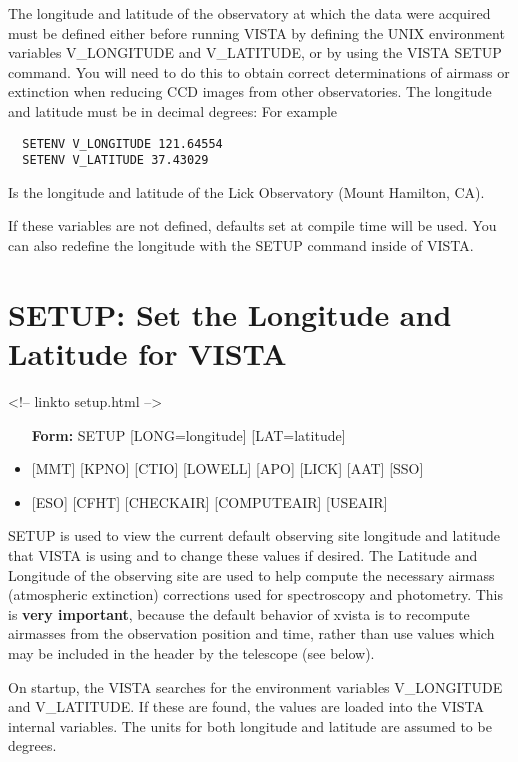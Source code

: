 The longitude and latitude of the observatory at which the data were
acquired must be defined either before running VISTA by defining the UNIX
environment variables V\_LONGITUDE and V\_LATITUDE, or by using the VISTA
SETUP command.  You will need to do this to obtain correct determinations of
airmass or extinction when reducing CCD images from other observatories.
The longitude and latitude must be in decimal degrees: For example
\begin{verbatim}
  SETENV V_LONGITUDE 121.64554
  SETENV V_LATITUDE 37.43029
\end{verbatim}
Is the longitude and latitude of the Lick Observatory (Mount Hamilton, CA).

If these variables are not defined, defaults set at compile time will be
used.  You can also redefine the longitude with the SETUP command inside of
VISTA.

\section{SETUP: Set the Longitude and Latitude for VISTA}
\begin{rawhtml}
<!-- linkto setup.html -->
\end{rawhtml}

\begin{itemize}
  \item[\textbf{Form: } SETUP {[LONG=longitude]} {[LAT=latitude]}\hfill]{}
  \item{{[MMT]} {[KPNO]} {[CTIO]} {[LOWELL]} {[APO]} {[LICK]} {[AAT]} {[SSO]}}
  \item{{[ESO]} {[CFHT]} {[CHECKAIR]} {[COMPUTEAIR]} {[USEAIR]}} 
\end{itemize}

SETUP is used to view the current default observing site longitude and
latitude that VISTA is using and to change these values if desired.  The
Latitude and Longitude of the observing site are used to help compute the
necessary airmass (atmospheric extinction) corrections used for
spectroscopy and photometry. This is \textbf{very important}, because
the default behavior of xvista is to recompute airmasses from the observation
position and time, rather than use values which may be included in the header 
by the telescope (see below).

On startup, the VISTA searches for the environment variables V\_LONGITUDE
and V\_LATITUDE.  If these are found, the values are loaded into the VISTA
internal variables.  The units for both longitude and latitude are assumed
to be degrees.

